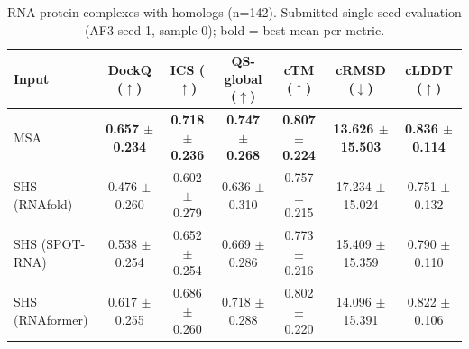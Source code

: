 \begin{table}[htbp]
\centering
\caption{RNA-protein complexes with homologs (n=142). Submitted single-seed evaluation (AF3 seed 1, sample 0); bold = best mean per metric.}
\label{tab:rna_protein_complexes_with_homologs}
\begin{tabular}{lcccccc}
\toprule
Input & DockQ ($\uparrow$) & ICS ($\uparrow$) & QS-global ($\uparrow$) & cTM ($\uparrow$) & cRMSD ($\downarrow$) & cLDDT ($\uparrow$) \\
\midrule
MSA & \textbf{0.657 $\pm$ 0.234} & \textbf{0.718 $\pm$ 0.236} & \textbf{0.747 $\pm$ 0.268} & \textbf{0.807 $\pm$ 0.224} & \textbf{13.626 $\pm$ 15.503} & \textbf{0.836 $\pm$ 0.114} \\
SHS (RNAfold) & 0.476 $\pm$ 0.260 & 0.602 $\pm$ 0.279 & 0.636 $\pm$ 0.310 & 0.757 $\pm$ 0.215 & 17.234 $\pm$ 15.024 & 0.751 $\pm$ 0.132 \\
SHS (SPOT-RNA) & 0.538 $\pm$ 0.254 & 0.652 $\pm$ 0.254 & 0.669 $\pm$ 0.286 & 0.773 $\pm$ 0.216 & 15.409 $\pm$ 15.359 & 0.790 $\pm$ 0.110 \\
SHS (RNAformer) & 0.617 $\pm$ 0.255 & 0.686 $\pm$ 0.260 & 0.718 $\pm$ 0.288 & 0.802 $\pm$ 0.220 & 14.096 $\pm$ 15.391 & 0.822 $\pm$ 0.106 \\
\bottomrule
\end{tabular}
\end{table}

